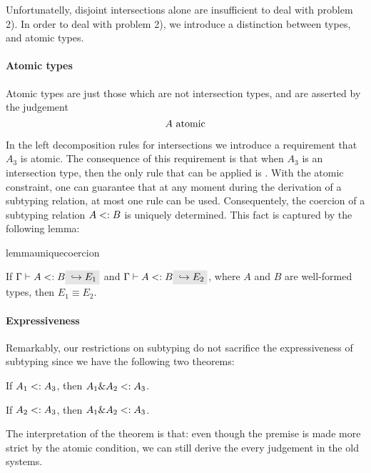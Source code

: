 Unfortunatelly, disjoint intersections alone are insufficient to deal with problem 2). 
In order to deal with problem 2), we introduce a distinction between types, and atomic types.

\paragraph{Atomic types} Atomic types are just those which are not intersection
types, and are asserted by the judgement \[ A \ \textnormal{atomic} \]

In the left decomposition rules for intersections we introduce a requirement that
$A_3$ is atomic. The consequence of this requirement is that when $A_3$ is an intersection type, then 
the only rule that can be applied is . 
With the atomic constraint, one can guarantee that at any moment during the
derivation of a subtyping relation, at most one rule can be used. 
Consequentely, the coercion of a subtyping relation $A <: B$ is uniquely determined.
This fact is captured by the following lemma:

\begin{restatable}{lemma}{uniquecoercion}
  \label{lemma:unique-coercion}

  If $\Gamma \vdash A \subtype B \yields {E_1}$ and $\Gamma \vdash A \subtype B \yields {E_2}$, where $A$
  and $B$ are well-formed types, then $E_1 \equiv E_2$.
\end{restatable}

\paragraph{Expressiveness}
Remarkably, our restrictions on subtyping do not sacrifice the expressiveness of
subtyping since we have the following two theorems:
\begin{theorem}
  If $A_1 <: A_3$, then $A_1 \& A_2 <: A_3$.
\end{theorem}
\begin{theorem}
If $A_2 <: A_3$, then $A_1 \& A_2 <: A_3$.
\end{theorem}


The interpretation of the theorem is that: even though the premise is made more
strict by the atomic condition, we can still derive the every judgement in the
old systems. 

